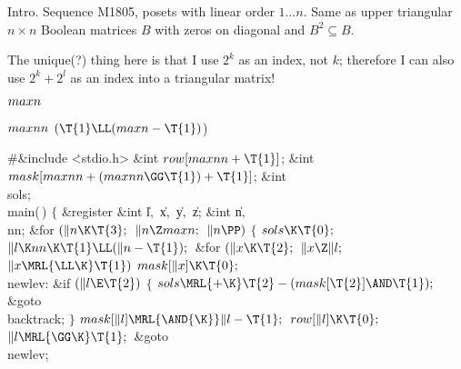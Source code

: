 
\hypertextrue\srcloctrue
\datethis

Intro. Sequence M1805, posets with linear order $1\ldots
n$.
Same as upper triangular $n\times n$ Boolean matrices $B$
with zeros on diagonal and $B^2\subseteq B$.

The unique(?) thing here is that I use $2^k$ as an index, not $k$;
therefore I can also use $2^k+2^l$ as an index into a triangular matrix!

\Y\B\4\D$\\{maxn}$ \5
\par
\B\4\D$\\{maxnn}$ \5
$(\T{1}\LL(\\{maxn}-\T{1}){}$)\par
\Y\B\8\#\&{include} \.{<stdio.h>}\6
\&{int} ${}\\{row}[\\{maxnn}+\T{1}]{}$;\6
\&{int} ${}\\{mask}[\\{maxnn}+(\\{maxnn}\GG\T{1})+\T{1}]{}$;\6
\&{int} \\{sols};\7
\\{main}(\,)\1\1\2\2\6
${}\{{}$\1\6
\&{register} \&{int} \|l${},{}$ \|x${},{}$ \|y${},{}$ \|z;\6
\&{int} \|n${},{}$ \\{nn};\7
\&{for} ${}(\|n\K\T{3};{}$ ${}\|n\Z\\{maxn};{}$ ${}\|n\PP){}$\5
${}\{{}$\1\6
${}\\{sols}\K\T{0};{}$\6
${}\|l\K\\{nn}\K\T{1}\LL(\|n-\T{1});{}$\6
\&{for} ${}(\|x\K\T{2};{}$ ${}\|x\Z\|l;{}$ ${}\|x\MRL{{\LL}{\K}}\T{1}){}$\1\5
${}\\{mask}[\|x]\K\T{0};{}$\2\6
\4\\{newlev}:\5
\&{if} ${}(\|l\E\T{2}){}$\5
${}\{{}$\1\6
${}\\{sols}\MRL{+{\K}}\T{2}-(\\{mask}[\T{2}]\AND\T{1});{}$\6
\&{goto} \\{backtrack};\6
\4${}\}{}$\2\6
${}\\{mask}[\|l]\MRL{\AND{\K}}\|l-\T{1};{}$\6
${}\\{row}[\|l]\K\T{0};{}$\6
${}\|l\MRL{{\GG}{\K}}\T{1};{}$\6
\&{goto} \\{newlev};\6
